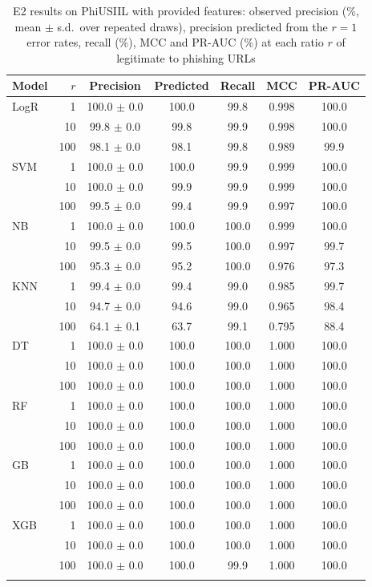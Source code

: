 \begin{table}[htbp]
\caption{E2 results on PhiUSIIL with provided features: observed precision (\%, mean $\pm$ s.d.\ over repeated draws), precision predicted from the $r=1$ error rates, recall (\%), MCC and PR-AUC (\%) at each ratio $r$ of legitimate to phishing URLs}\label{tab:e2-provided}%
\begin{tabular}{@{}lrccccc@{}}
\toprule
Model & $r$ & Precision & Predicted & Recall & MCC & PR-AUC \\
\midrule
LogR & 1 & 100.0 $\pm$ 0.0 & 100.0 & 99.8 & 0.998 & 100.0 \\
 & 10 & 99.8 $\pm$ 0.0 & 99.8 & 99.9 & 0.998 & 100.0 \\
 & 100 & 98.1 $\pm$ 0.0 & 98.1 & 99.8 & 0.989 & 99.9 \\
SVM & 1 & 100.0 $\pm$ 0.0 & 100.0 & 99.9 & 0.999 & 100.0 \\
 & 10 & 100.0 $\pm$ 0.0 & 99.9 & 99.9 & 0.999 & 100.0 \\
 & 100 & 99.5 $\pm$ 0.0 & 99.4 & 99.9 & 0.997 & 100.0 \\
NB & 1 & 100.0 $\pm$ 0.0 & 100.0 & 100.0 & 0.999 & 100.0 \\
 & 10 & 99.5 $\pm$ 0.0 & 99.5 & 100.0 & 0.997 & 99.7 \\
 & 100 & 95.3 $\pm$ 0.0 & 95.2 & 100.0 & 0.976 & 97.3 \\
KNN & 1 & 99.4 $\pm$ 0.0 & 99.4 & 99.0 & 0.985 & 99.7 \\
 & 10 & 94.7 $\pm$ 0.0 & 94.6 & 99.0 & 0.965 & 98.4 \\
 & 100 & 64.1 $\pm$ 0.1 & 63.7 & 99.1 & 0.795 & 88.4 \\
DT & 1 & 100.0 $\pm$ 0.0 & 100.0 & 100.0 & 1.000 & 100.0 \\
 & 10 & 100.0 $\pm$ 0.0 & 100.0 & 100.0 & 1.000 & 100.0 \\
 & 100 & 100.0 $\pm$ 0.0 & 100.0 & 100.0 & 1.000 & 100.0 \\
RF & 1 & 100.0 $\pm$ 0.0 & 100.0 & 100.0 & 1.000 & 100.0 \\
 & 10 & 100.0 $\pm$ 0.0 & 100.0 & 100.0 & 1.000 & 100.0 \\
 & 100 & 100.0 $\pm$ 0.0 & 100.0 & 100.0 & 1.000 & 100.0 \\
GB & 1 & 100.0 $\pm$ 0.0 & 100.0 & 100.0 & 1.000 & 100.0 \\
 & 10 & 100.0 $\pm$ 0.0 & 100.0 & 100.0 & 1.000 & 100.0 \\
 & 100 & 100.0 $\pm$ 0.0 & 100.0 & 100.0 & 1.000 & 100.0 \\
XGB & 1 & 100.0 $\pm$ 0.0 & 100.0 & 100.0 & 1.000 & 100.0 \\
 & 10 & 100.0 $\pm$ 0.0 & 100.0 & 100.0 & 1.000 & 100.0 \\
 & 100 & 100.0 $\pm$ 0.0 & 100.0 & 99.9 & 1.000 & 100.0 \\
\botrule
\end{tabular}
\end{table}
